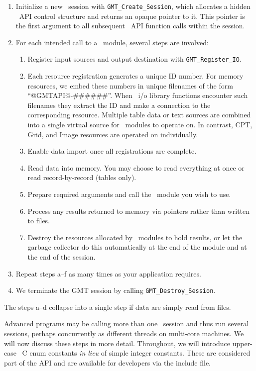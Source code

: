 \documentclass[11pt]{report}
\begin{document}
\begin{enumerate}
\item Initialize a new \GMT\ session with \texttt{GMT\_Create\_Session}, which
allocates a hidden \GMT\ API control structure and returns an opaque pointer to it.  This pointer is
the first argument to all subsequent \GMT\ API function calls within the session.
\item For each intended call to a \GMT\ module, several steps are involved:
\begin{enumerate}
\item Register input sources and output destination with \texttt{GMT\_Register\_IO}.
\item Each resource registration generates a unique ID number.  For memory resources, we embed these numbers
in unique filenames of the form ``@GMTAPI@-\#\#\#\#\#\#''.  When
\GMT\ i/o library functions encounter such filenames they extract the ID and make a connection
to the corresponding resource.  Multiple table data or text sources
are combined into a single virtual source for \GMT\ modules to operate on.
In contrast, CPT, Grid, and Image resources are operated on individually.
\item Enable data import once all registrations are complete.
\item Read data into memory. You may choose to read everything at once or read record-by-record (tables only).
\item Prepare required arguments and call the \GMT\ module you wish to use.
\item Process any results returned to memory via pointers rather than written to files.
\item Destroy the resources allocated by \GMT\ modules to hold results, or let the
garbage collector do this automatically at the end of the module and at the end of the session.
\end{enumerate}
\item Repeat steps a--f as many times as your application requires.
\item We terminate the GMT session by calling \texttt{GMT\_Destroy\_Session}.
\end{enumerate}

The steps a--d collapse into a single step if data are simply read from files.

Advanced programs may be calling more than one \GMT\ session and thus run several
sessions, perhaps concurrently as different threads on multi-core machines.
We will now discuss these steps in more detail.  Throughout, we will introduce upper-case \GMT\ C enum
constants \emph{in lieu} of simple integer constants.  These are considered part of the API
and are available for developers via the  include file.
\end{document}

